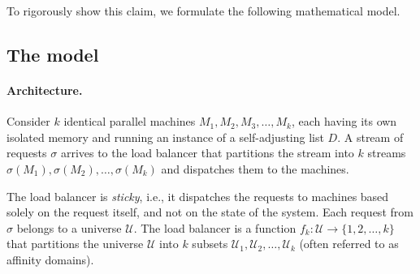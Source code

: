To rigorously show this claim, we formulate the following mathematical model.






\subsection{The model}
\label{sec:model}

\paragraph{Architecture.}

Consider $k$ identical parallel machines $M_1, M_2, M_3, \ldots, M_k$, each having its own isolated memory and running an instance of a self-adjusting list $D$. A stream of requests $\sigma$ arrives to the load balancer that partitions the stream into $k$ streams $\sigma(M_1), \sigma(M_2), \ldots, \sigma(M_k)$ and dispatches them to the machines.

The load balancer is \emph{sticky}, i.e., it dispatches the requests to machines based solely on the request itself, and not on the state of the system.
Each request from $\sigma$ belongs to a universe $\mathcal{U}$. 
The load balancer is a function $f_k : \mathcal{U} \to \{1, 2, \ldots, k\}$ that partitions the universe $\mathcal{U}$ into $k$ subsets $\mathcal{U}_1, \mathcal{U}_2, \ldots, \mathcal{U}_k$ (often referred to as affinity domains).

